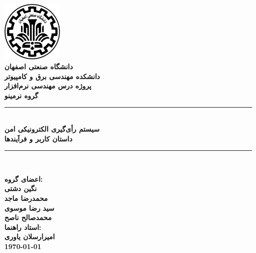 \documentclass[12pt]{article}
\begin{document}
\pagestyle{empty}
\begin{titlepage}
\begin{center}
\includegraphics[width=3cm]{logo.png} \\
{\fontsize{12}{12}\selectfont \bfseries دانشگاه صنعتی اصفهان}\\
{\fontsize{12}{12}\selectfont \bfseries دانشکده مهندسی برق و کامپیوتر}\\
\vspace{2cm}
{\fontsize{14}{14}\selectfont \bfseries پروژه درس مهندسی نرم‌افزار} \\[5mm]
{\fontsize{18}{18}\selectfont \bfseries گروه نرمینو} \\[5mm]
{\textcolor{Blue}{\rule{\textwidth}{1mm}}}  \\
{\fontsize{24}{24}\selectfont \bfseries
سیستم رأی‌گیری الکترونیکی امن
}\\[5mm]
{\fontsize{16}{16}\selectfont \bfseries داستان کاربر و فرآیندها}
\\
{\textcolor{Blue}{\rule{\textwidth}{1mm}}}  \\
\vspace{1cm}

{\fontsize{14}{14}\selectfont \bfseries اعضای گروه:} \\[3mm]
{\fontsize{16}{16}\selectfont \bfseries نگین دشتی } \\
{\fontsize{16}{16}\selectfont \bfseries محمدرضا ماجد} \\
{\fontsize{16}{16}\selectfont \bfseries سید رضا موسوی } \\
{\fontsize{16}{16}\selectfont \bfseries محمدصالح ناصح  } \\
\vspace{1cm}
{\fontsize{14}{14}\selectfont \bfseries استاد راهنما: } \\[3mm]
{\fontsize{16}{16}\selectfont \bfseries امیرارسلان یاوری } \\
\vfill
{\fontsize{16}{16}\selectfont \bfseries\today}
\end{center}
\end{titlepage}
\clearpage
\tableofcontents
\clearpage
\pagestyle{fancy}
\lhead{}
\rhead{}
\end{document}
